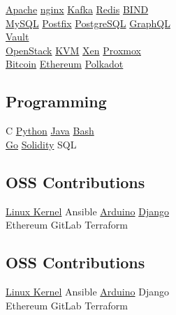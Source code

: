 \documentclass[]{willianpaixao-resume}
\begin{document}
\begin{minipage}[t]{0.34\textwidth}
\href{https://httpd.apache.org/}{Apache}\textbullet{}
\href{https://nginx.org/}{nginx}\textbullet{}
\href{https://kafka.apache.org/}{Kafka}\textbullet{}
\href{https://redis.io/}{Redis}\textbullet{}
\href{https://www.isc.org/bind/}{BIND}\\
\href{https://www.mysql.com/}{MySQL}\textbullet{}
\href{https://www.postfix.org/}{Postfix}\textbullet{}
\href{https://www.postgresql.org/}{PostgreSQL}\textbullet{}
\href{https://graphql.org/}{GraphQL}\\
\href{https://www.hashicorp.com/en/products/vault}{Vault}\\
\href{https://www.openstack.org/}{OpenStack}\textbullet{}
\href{https://linux-kvm.org/}{KVM}\textbullet{}
\href{https://xenproject.org/}{Xen} \textbullet{}
\href{https://www.proxmox.com/}{Proxmox}\\
\href{https://bitcoincore.org/}{Bitcoin}\textbullet{}
\href{https://ethereum.org/}{Ethereum}\textbullet{}
\href{https://polkadot.com/}{Polkadot}
\sectionsep

\subsection{Programming}
C\textbullet
\href{http://www.python.org}{Python}\textbullet{}
\href{https://www.oracle.com/java/}{Java}\textbullet{}
\href{https://www.gnu.org/software/bash/}{Bash}\\
\href{https://go.dev/}{Go}\textbullet{}
\href{https://soliditylang.org/}{Solidity}\textbullet{}
SQL
\sectionsep

\subsection{OSS Contributions}
\href{https://kernel.org/}{Linux Kernel}\textbullet{}
Ansible\textbullet{}
\href{https://www.arduino.cc/}{Arduino}\textbullet{}
\href{https://www.djangoproject.com/}{Django}\\
Ethereum\textbullet{}
GitLab\textbullet{}
Terraform
\sectionsep

\subsection{OSS Contributions}
\href{https://kernel.org/}{Linux Kernel}\textbullet{}
Ansible\textbullet{}
\href{https://www.arduino.cc/}{Arduino}\textbullet{}
Django\\
Ethereum\textbullet{}
GitLab\textbullet{}
Terraform
\sectionsep


\end{minipage}
\end{document}
